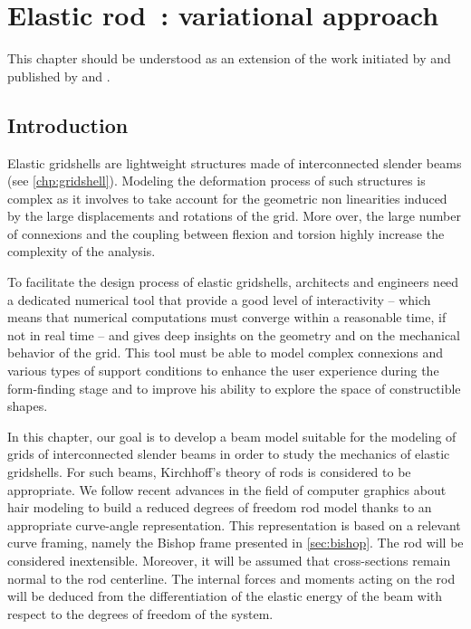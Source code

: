 
\chapter{Elastic rod~: variational approach}
\label{chp:energy}

This chapter should be understood as an extension of the work initiated by  and published by  and .

\section{Introduction}

Elastic gridshells are lightweight structures made of interconnected slender beams (see \cref{chp:gridshell}). Modeling the deformation process of such structures is complex as it involves to take account for the geometric non linearities induced by the large displacements and rotations of the grid. More over, the large number of connexions and the coupling between flexion and torsion highly increase the complexity of the analysis.

To facilitate the design process of elastic gridshells, architects and engineers need a dedicated numerical tool that provide a good level of interactivity -- which means that numerical computations must converge within a reasonable time, if not in real time -- and gives deep insights on the geometry and on the mechanical behavior of the grid. This tool must be able to model complex connexions and various types of support conditions to enhance the user experience during the form-finding stage and to improve his ability to explore the space of constructible shapes.

In this chapter, our goal is to develop a beam model suitable for the modeling of grids of interconnected slender beams in order to study the mechanics of elastic gridshells. For such beams, Kirchhoff's theory of rods is considered to be appropriate. We follow recent advances in the field of computer graphics about hair modeling \cite{Bergou2008} to build a reduced degrees of freedom rod model thanks to an appropriate curve-angle representation. This representation is based on a relevant curve framing, namely the Bishop frame presented in \cref{sec:bishop}. The rod will be considered inextensible. Moreover, it will be assumed that cross-sections remain normal to the rod centerline. The internal forces and moments acting on the rod will be deduced from the differentiation of the elastic energy of the beam with respect to the degrees of freedom of the system.

